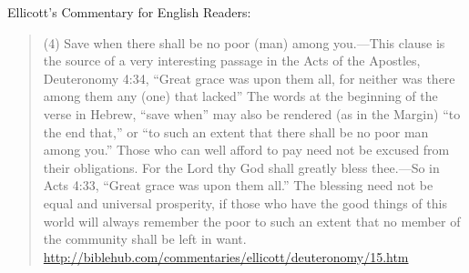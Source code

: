 \documentclass[11pt]{article}
\begin{document}
Ellicott's Commentary for English Readers:
\begin{quote}
(4) Save when there shall be no poor (man) among you.—This clause is the source of a very interesting passage in the Acts of the Apostles, Deuteronomy 4:34, “Great grace was upon them all, for neither was there among them any (one) that lacked” The words at the beginning of the verse in Hebrew, “save when” may also be rendered (as in the Margin) “to the end that,” or “to such an extent that there shall be no poor man among you.” Those who can well afford to pay need not be excused from their obligations.
For the Lord thy God shall greatly bless thee.—So in Acts 4:33, “Great grace was upon them all.” The blessing need not be equal and universal prosperity, if those who have the good things of this world will always remember the poor to such an extent that no member of the community shall be left in want. \url{http://biblehub.com/commentaries/ellicott/deuteronomy/15.htm}
\end{quote}
\end{document}
